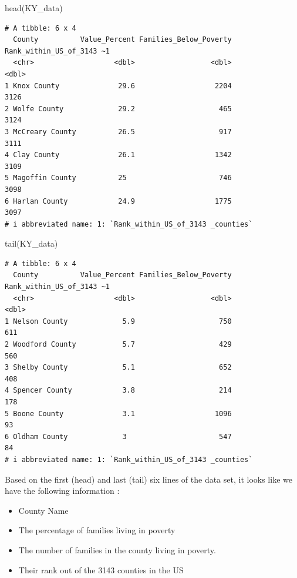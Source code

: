\documentclass[
  letterpaper,
  DIV=11,
  numbers=noendperiod]{scrreprt}
\newenvironment{Shaded}{\begin{snugshade}}{\end{snugshade}}
\newcommand{\FunctionTok}[1]{\textcolor[rgb]{0.28,0.35,0.67}{#1}}
\newcommand{\NormalTok}[1]{\textcolor[rgb]{0.00,0.23,0.31}{#1}}
\providecommand{\tightlist}{%
  \setlength{\itemsep}{0pt}\setlength{\parskip}{0pt}}\usepackage{longtable,booktabs,array}
\begin{document}
\begin{Shaded}
\begin{Highlighting}[]
\FunctionTok{head}\NormalTok{(KY\_data)}
\end{Highlighting}
\end{Shaded}

\begin{verbatim}
# A tibble: 6 x 4
  County          Value_Percent Families_Below_Poverty Rank_within_US_of_3143 ~1
  <chr>                   <dbl>                  <dbl>                     <dbl>
1 Knox County              29.6                   2204                      3126
2 Wolfe County             29.2                    465                      3124
3 McCreary County          26.5                    917                      3111
4 Clay County              26.1                   1342                      3109
5 Magoffin County          25                      746                      3098
6 Harlan County            24.9                   1775                      3097
# i abbreviated name: 1: `Rank_within_US_of_3143 _counties`
\end{verbatim}

\begin{Shaded}
\begin{Highlighting}[]
\FunctionTok{tail}\NormalTok{(KY\_data)}
\end{Highlighting}
\end{Shaded}

\begin{verbatim}
# A tibble: 6 x 4
  County          Value_Percent Families_Below_Poverty Rank_within_US_of_3143 ~1
  <chr>                   <dbl>                  <dbl>                     <dbl>
1 Nelson County             5.9                    750                       611
2 Woodford County           5.7                    429                       560
3 Shelby County             5.1                    652                       408
4 Spencer County            3.8                    214                       178
5 Boone County              3.1                   1096                        93
6 Oldham County             3                      547                        84
# i abbreviated name: 1: `Rank_within_US_of_3143 _counties`
\end{verbatim}

Based on the first (head) and last (tail) six lines of the data set, it
looks like we have the following information :

\begin{itemize}
\tightlist
\item
  County Name
\item
  The percentage of families living in poverty
\item
  The number of families in the county living in poverty.
\item
  Their rank out of the 3143 counties in the US
\end{itemize}
\end{document}
